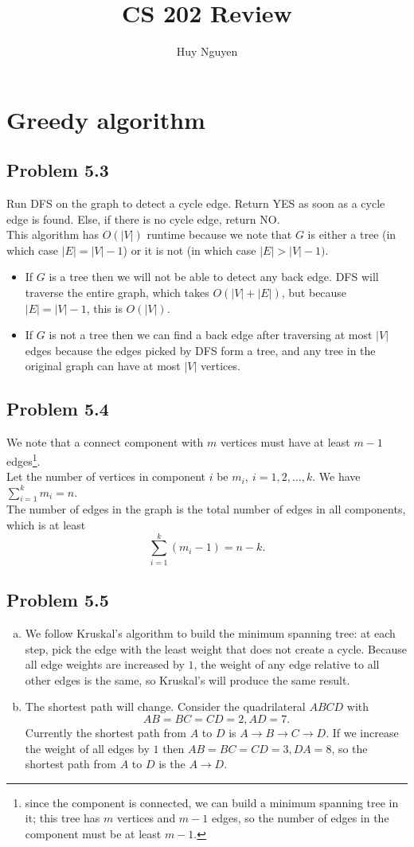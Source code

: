 \documentclass[12pt]{report}
\title{CS 202 Review}
\author{Huy Nguyen}
\begin{document}
\tableofcontents

\chapter[Chapter 5 Solution]{Greedy algorithm}

\section{Problem 5.3}
Run DFS on the graph to detect a cycle edge. Return YES as soon as a cycle edge is found. Else, if there is no cycle edge, return NO.\\
This algorithm has $O(|V|)$ runtime because we note that $G$ is either a tree (in which case $|E| = |V| - 1$) or it is not (in which case $|E| > |V| - 1)$.
\begin{itemize}
  \item If $G$ is a tree then we will not be able to detect any back edge. DFS will traverse the entire graph, which takes $O(|V| + |E|)$, but because $|E| = |V| - 1$, this is $O(|V|)$.
  \item If $G$ is not a tree then we can find a back edge after traversing at most $|V|$ edges because the edges picked by DFS form a tree, and any tree in the original graph can have at most $|V|$ vertices.
\end{itemize}

\section{Problem 5.4}
We note that a connect component with $m$ vertices must have at least $m - 1$ edges\footnote{since the component is connected, we can build a minimum spanning tree in it; this tree has $m$ vertices and $m-1$ edges, so the number of edges in the component must be at least $m-1$.}. \\
Let the number of vertices in component $i$ be $m_i, \ i = 1,2,\ldots,k$. We have $\displaystyle \sum_{i=1}^k m_i = n$.\\
The number of edges in the graph is the total number of edges in all components, which is at least $$\sum_{i=1}^k (m_i - 1) = n - k.$$


\section{Problem 5.5}
\begin{enumerate}[(a)]
  \item We follow Kruskal's algorithm to build the minimum spanning tree: at each step, pick the edge with the least weight that does not create a cycle. Because all edge weights are increased by $1$, the weight of any edge relative to all other edges is the same, so Kruskal's will produce the same result.
  \item The shortest path will change. Consider the quadrilateral $ABCD$ with $$AB = BC = CD = 2, AD = 7.$$ Currently the shortest path from $A$ to $D$ is $A \to B \to C \to D$. If we increase the weight of all edges by $1$ then $AB = BC = CD = 3, DA = 8$, so the shortest path from $A$ to $D$ is the $A \to D$.
\end{enumerate}
\end{document}
